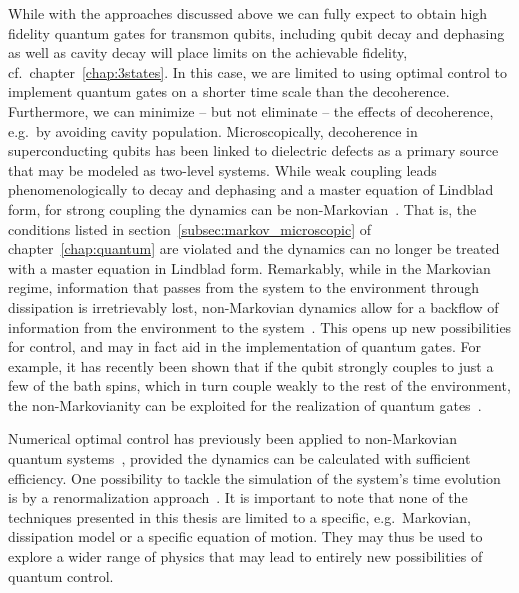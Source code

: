 While with the approaches discussed above we can fully expect to obtain high
fidelity quantum gates for transmon qubits, including qubit decay and dephasing
as well as cavity decay will place limits on the achievable fidelity,
cf.~chapter~\ref{chap:3states}. In this case, we are limited to using optimal
control to implement quantum gates on a shorter time scale than the decoherence.
Furthermore, we can minimize -- but not eliminate -- the effects of decoherence,
e.g.\ by avoiding cavity population. Microscopically, decoherence in
superconducting qubits has been linked to dielectric defects as a primary
source~\cite{MartinisPRL2005,ShaliboPRL2010} that may be modeled as two-level
systems. While weak coupling leads phenomenologically to decay and dephasing and
a master equation of Lindblad form, for strong coupling the dynamics can be
non-Markovian~\cite{KroviPRA2007,FerraroPRB2008,LorenzoPRA2013}. That is, the
conditions listed in section~\ref{subsec:markov_microscopic} of
chapter~\ref{chap:quantum} are violated and the dynamics can no longer be
treated with a master equation in Lindblad form. Remarkably, while in the
Markovian regime, information that passes from the system to the environment
through dissipation is irretrievably lost, non-Markovian dynamics allow for
a backflow of information from the environment to the
system~\cite{BreuerPRL2009,BreuerJPB2012}. This opens up new possibilities for
control, and may in fact aid in the implementation of quantum gates. For
example, it has recently been shown that if the qubit
strongly couples to just a few of the bath spins, which in turn couple weakly to
the rest of the environment, the non-Markovianity can be exploited for the
realization of quantum gates~\cite{ReichNonMarkov}.

Numerical optimal control has previously been applied to non-Markovian quantum
systems~\cite{RebentrostPRL09,AsplundPRL11,SchmidtPRL11,FloetherNJP12},
provided the dynamics can be calculated with sufficient efficiency.
One possibility to tackle the simulation of the system's time evolution is by
a renormalization approach~\cite{GualdiPRA2013}.
It is important to note that none of the techniques presented in this thesis are
limited to a specific, e.g.\ Markovian, dissipation model or a specific equation
of motion. They may thus be used to explore a wider range of physics that may
lead to entirely new possibilities of quantum control.

